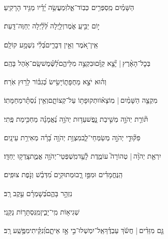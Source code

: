 \documentclass[12pt]{article}
\newcommand{\loc}[1]{\textsuperscript{\locf{#1}}}
\begin{document}
{\loc{ ב}~}‏הַשָּׁמַ֗יִם מְֽסַפְּרִ֥ים כְּבֽוֹד־אֵ֑ל{\hfill}וּֽמַעֲשֵׂ֥ה יָ֝דָ֗יו מַגִּ֥יד הָרָקִֽיעַ׃\par

{\loc{ ג}~}‏י֣וֹם  יַבִּ֣יעַֽ אֹ֑מֶר{\hfill}וְלַ֥יְלָה לְּ֝לַ֗יְלָה יְחַוֶּה־דָּֽעַת׃\par

{\loc{ ד}~}‏אֵֽין־אֹ֭מֶר וְאֵ֣ין דְּבָרִ֑ים{\hfill}בְּ֝לִ֗י נִשְׁמָ֥ע קוֹלָֽם׃\par

{\loc{ ה}~}‏בְּכׇל־הָאָ֨רֶץ |  יָ֘צָ֤א קַוָּ֗ם{\hfill}וּבִקְצֵ֣ה  מִלֵּיהֶ֑ם\newline\hspace*{.5em}לַ֝שֶּׁ֗מֶשׁ{\hfill}שָֽׂם־אֹ֥הֶל בָּהֶֽם׃\par

{\loc{ ו}~}‏וְה֗וּא  יֹצֵ֣א מֵחֻפָּת֑וֹ{\hfill}יָשִׂ֥ישׂ כְּ֝גִבּ֗וֹר לָר֥וּץ אֹֽרַח׃\par

{\loc{ ז}~}‏מִקְצֵ֤ה הַשָּׁמַ֨יִם |  מֽוֹצָא֗וֹ{\hfill}וּתְקוּפָת֥וֹ עַל־קְצוֹתָ֑ם\newline\hspace*{.5em}וְאֵ֥ין נִ֝סְתָּ֗ר{\hfill}מֵחַמָּתֽוֹ׃\par

{\loc{ ח}~}‏תּ֘וֹרַ֤ת יְהֹוָ֣ה  מְשִׁ֣יבַת נָ֑פֶשׁ{\hfill}עֵד֥וּת יְהֹוָ֥ה נֶ֝אֱמָנָ֗ה מַחְכִּ֥ימַת פֶּֽתִי׃\par

{\loc{ ט}~}‏פִּקּ֘וּדֵ֤י יְהֹוָ֣ה  מְשַׂמְּחֵי־לֵ֑ב{\hfill}מִצְוַ֥ת יְהֹוָ֥ה בָּ֝רָ֗ה מְאִירַ֥ת עֵינָֽיִם׃\par

{\loc{ י}~}‏יִרְאַ֤ת יְהֹוָ֨ה | {\hfill}טְהוֹרָה֮ עוֹמֶ֢דֶת לָ֫עַ֥ד\newline\hspace*{.5em}מִֽשְׁפְּטֵי־יְהֹוָ֥ה אֱמֶ֑ת{\hfill}צָֽדְק֥וּ יַחְדָּֽו׃\par

{\loc{ יא}~}‏הַֽנֶּחֱמָדִ֗ים  וּמִפַּ֣ז רָ֑ב{\hfill}וּמְתוּקִ֥ים מִ֝דְּבַ֗שׁ וְנֹ֣פֶת צוּפִֽים׃\par

{\loc{ יב}~}‏ נִזְהָ֣ר בָּהֶ֑ם{\hfill}בְּ֝שׇׁמְרָ֗ם עֵ֣קֶב רָֽב׃\par

{\loc{ יג}~}‏שְׁגִיא֥וֹת מִֽי־יָבִ֑ין{\hfill}מִֽנִּסְתָּר֥וֹת נַקֵּֽנִי׃\par

{\loc{ יד}~}‏גַּ֤ם מִזֵּדִ֨ים |  חֲשֹׂ֬ךְ עַבְדֶּ֗ךָ{\hfill}אַֽל־יִמְשְׁלוּ־בִ֣י אָ֣ז אֵיתָ֑ם\newline\hspace*{.5em}וְ֝נִקֵּ֗יתִי{\hfill}מִפֶּ֥שַֽׁע רָֽב׃\par
\end{document}
